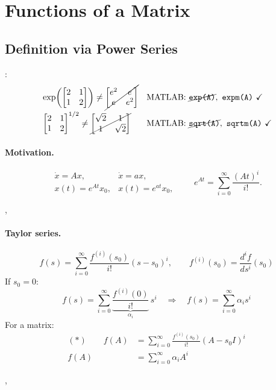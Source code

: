 \section{Functions of a Matrix}\label{sec:functions}
\subsection{Definition via Power Series}\label{ss:fn-def}
:
\begin{align*}
&\exp\!\left(\bmat{2&1\\1&2}\right) \neq \cancel{\bmat{e^2 & e\\ e & e^2}}
&& \text{MATLAB: } \cancel{\texttt{exp(A)}},\ \texttt{expm(A)}\ \checkmark\\
&\bmat{2&1\\1&2}^{1/2} \neq \cancel{\bmat{\sqrt2 & 1\\ 1 & \sqrt2}}
&& \text{MATLAB: } \cancel{\texttt{sqrt(A)}},\ \texttt{sqrtm(A)}\ \checkmark
\end{align*}
\paragraph{Motivation.}
\[
\begin{array}{ll}
\dot{x} = Ax, & \dot{x} = ax,\\
x(t) = e^{At}x_0, & x(t) = e^{at}x_0,
\end{array}
\qquad
e^{At} = \sum_{i=0}^{\infty}\frac{(At)^i}{i!}.
\]

\sep
\paragraph{Taylor series.}
\[
f(s) = \sum_{i=0}^{\infty}\frac{f^{(i)}(s_0)}{i!}(s-s_0)^i,
\qquad
f^{(i)}(s_0) = \frac{d^i f}{ds^i}(s_0)
\]
If $s_0=0$:
\[
f(s) = \sum_{i=0}^{\infty}\underbrace{\frac{f^{(i)}(0)}{i!}}_{\alpha_i}\, s^i
\quad\Longrightarrow\quad
f(s) = \sum_{i=0}^{\infty}\alpha_i s^i
\]
For a matrix:
\begin{align*}
(\ast)\qquad f(A) &= \sum_{i=0}^{\infty}\frac{f^{(i)}(s_0)}{i!}(A-s_0I)^i\\
f(A) &= \sum_{i=0}^{\infty}\alpha_i A^i
\end{align*}

\sep
